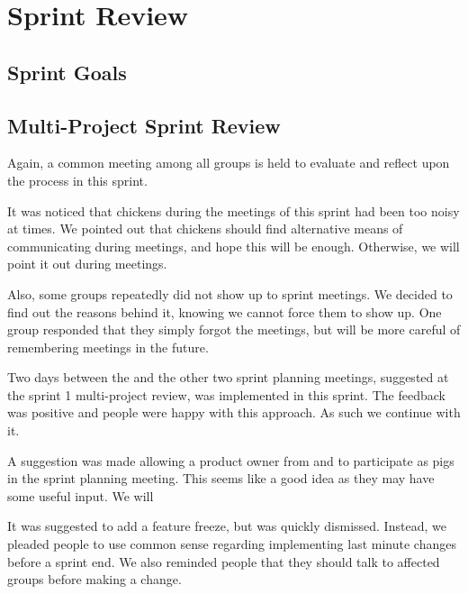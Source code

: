 \chapter{Sprint Review}\label{chap:sprint2_end}
\section{Sprint Goals}



\section{Multi-Project Sprint Review}
Again, a common meeting among all groups is held to evaluate and reflect upon the process in this sprint.

It was noticed that chickens during the meetings of this sprint had been too noisy at times. We pointed out that chickens should find alternative means of communicating during meetings, and hope this will be enough. Otherwise, we will point it out during meetings.

Also, some groups repeatedly did not show up to sprint meetings. We decided to find out the reasons behind it, knowing we cannot force them to show up. One group responded that they simply forgot the meetings, but will be more careful of remembering meetings in the future.

Two days between the \gui and the other two sprint planning meetings, suggested at the sprint 1 multi-project review, was implemented in this sprint. The feedback was positive and people were happy with this approach. As such we continue with it.

A suggestion was made allowing a product owner from \db and \bd to participate as pigs in the \gui sprint planning meeting. This seems like a good idea as they may have some useful input. We will 

It was suggested to add a feature freeze, but was quickly dismissed. Instead, we pleaded people to use common sense regarding implementing last minute changes before a sprint end. We also reminded people that they should talk to affected groups before making a change.